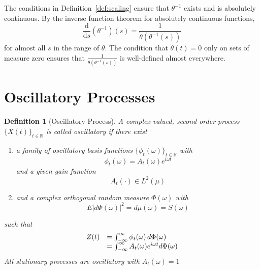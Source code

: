 \documentclass{article}
\newcommand{\cdummy}{\cdot}
\newcommand{\mathd}{\mathrm{d}}
\newcommand{\tmem}[1]{{\em #1\/}}
\newtheorem{definition}{Definition}
\begin{document}
\begin{remark}
  \label{rem:inverse_properties}The conditions in Definition~\ref{def:scaling}
  ensure that $\theta^{- 1}$ exists and is absolutely continuous. By the
  inverse function theorem for absolutely continuous functions,
  \begin{equation}
    \frac{\mathd}{\mathd s} (\theta^{- 1}) (s) = \frac{1}{\dot{\theta}
    (\theta^{- 1} (s))}
  \end{equation}
  for almost all $s$ in the range of $\theta$. The condition that
  $\dot{\theta} (t) = 0$ only on sets of measure zero ensures that
  $\frac{1}{\dot{\theta} (\theta^{- 1} (s))}$ is well-defined almost
  everywhere.
\end{remark}

\section{Oscillatory Processes}\label{sec:oscillatory}

\begin{definition}
  [Oscillatory Process]\label{def:oscillatory} A complex-valued, second-order
  process $\{X (t) \}_{t \in \mathbb{R}}$ is called {\tmem{oscillatory}} if
  there exist
  \begin{enumerate}
    \item a family of oscillatory basis functions $\{\phi_t (\omega)\}_{t \in
    \mathbb{R}}$ with
    \begin{equation}
      \phi_t (\omega) = A_t (\omega) e^{i \omega t}
    \end{equation}
    and a given gain function
    \begin{equation}
      A_t (\cdummy) \in L^2 (\mu) \label{envelope}
    \end{equation}
    \item and a complex orthogonal random measure $\Phi (\omega)$ with
    \begin{equation}
      E \lvert d \Phi (\omega) \rvert^2 = d \mu (\omega) = S (\omega)
    \end{equation}
  \end{enumerate}
  such that
  \begin{equation}
    \label{eq:oscillatory_rep} \begin{array}{ll}
      Z (t) & = \int_{- \infty}^{\infty} \phi_t (\omega)  \hspace{0.17em} d
      \Phi (\omega)\\
      & = \int_{- \infty}^{\infty} A_t (\omega) e^{i \omega t} d \Phi
      (\omega)
    \end{array}
  \end{equation}
  All stationary processes are oscillatory with $A_t (\omega) = 1$
\end{definition}
\end{document}
